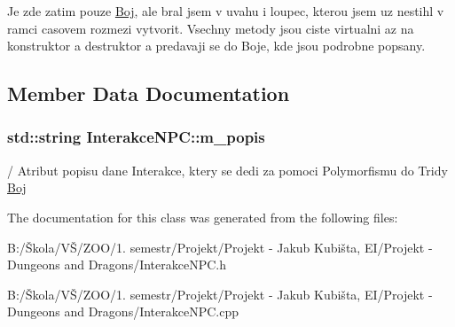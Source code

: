 Je zde zatim pouze \hyperlink{class_boj}{Boj}, ale bral jsem v uvahu i loupec, kterou jsem uz nestihl v ramci casovem rozmezi vytvorit. Vsechny metody jsou ciste virtualni az na konstruktor a destruktor a predavaji se do Boje, kde jsou podrobne popsany. 

\subsection{Member Data Documentation}
\hypertarget{class_interakce_n_p_c_ad104454fab5bd9ac2ab5c5c36eceb2b3}{
\subsubsection[{m\-\_\-popis}]{\setlength{\rightskip}{0pt plus 5cm}std\-::string Interakce\-N\-P\-C\-::m\-\_\-popis\hspace{0.3cm}{\ttfamily [protected]}}}\label{class_interakce_n_p_c_ad104454fab5bd9ac2ab5c5c36eceb2b3}
/ Atribut popisu dane Interakce, ktery se dedi za pomoci Polymorfismu do Tridy \hyperlink{class_boj}{Boj} 

The documentation for this class was generated from the following files\-:\begin{DoxyCompactItemize}
\item 
B\-:/Škola/\-VŠ/\-Z\-O\-O/1. semestr/\-Projekt/\-Projekt -\/ Jakub Kubišta, E\-I/\-Projekt -\/ Dungeons and Dragons/Interakce\-N\-P\-C.\-h\item 
B\-:/Škola/\-VŠ/\-Z\-O\-O/1. semestr/\-Projekt/\-Projekt -\/ Jakub Kubišta, E\-I/\-Projekt -\/ Dungeons and Dragons/Interakce\-N\-P\-C.\-cpp\end{DoxyCompactItemize}
